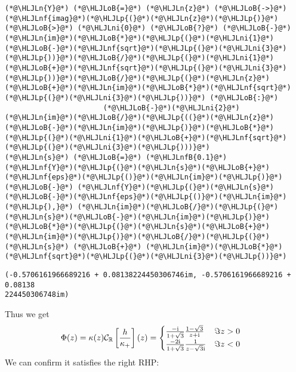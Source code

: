 \documentclass[12pt,landscape]{article}
\newcommand{\HLJLn}[1]{#1}
\newcommand{\HLJLnf}[1]{\textcolor[RGB]{66,102,213}{#1}}
\newcommand{\HLJLnfB}[1]{\textcolor[RGB]{59,151,46}{#1}}
\newcommand{\HLJLni}[1]{\textcolor[RGB]{59,151,46}{#1}}
\newcommand{\HLJLoB}[1]{\textcolor[RGB]{102,102,102}{\textbf{#1}}}
\newcommand{\HLJLp}[1]{#1}
\def\I{ {\rm i} }
\def\R{ {\mathbb R} }
\def\CC{ {\cal C} }
\def\br[#1]{\left[{#1}\right]}
\begin{document}
{\begin{lstlisting}
(*@\HLJLn{Y}@*) (*@\HLJLoB{=}@*) (*@\HLJLn{z}@*) (*@\HLJLoB{->}@*) (*@\HLJLnf{imag}@*)(*@\HLJLp{(}@*)(*@\HLJLn{z}@*)(*@\HLJLp{)}@*) (*@\HLJLoB{>}@*) (*@\HLJLni{0}@*) (*@\HLJLoB{?}@*) (*@\HLJLoB{-}@*)(*@\HLJLn{im}@*)(*@\HLJLoB{*}@*)(*@\HLJLp{(}@*)(*@\HLJLni{1}@*)(*@\HLJLoB{-}@*)(*@\HLJLnf{sqrt}@*)(*@\HLJLp{(}@*)(*@\HLJLni{3}@*)(*@\HLJLp{))}@*)(*@\HLJLoB{/}@*)(*@\HLJLp{(}@*)(*@\HLJLni{1}@*)(*@\HLJLoB{+}@*)(*@\HLJLnf{sqrt}@*)(*@\HLJLp{(}@*)(*@\HLJLni{3}@*)(*@\HLJLp{))}@*)(*@\HLJLoB{/}@*)(*@\HLJLp{(}@*)(*@\HLJLn{z}@*)(*@\HLJLoB{+}@*)(*@\HLJLn{im}@*)(*@\HLJLoB{*}@*)(*@\HLJLnf{sqrt}@*)(*@\HLJLp{(}@*)(*@\HLJLni{3}@*)(*@\HLJLp{))}@*) (*@\HLJLoB{:}@*)
                       (*@\HLJLoB{-}@*)(*@\HLJLni{2}@*)(*@\HLJLn{im}@*)(*@\HLJLoB{/}@*)(*@\HLJLp{((}@*)(*@\HLJLn{z}@*)(*@\HLJLoB{-}@*)(*@\HLJLn{im}@*)(*@\HLJLp{)}@*)(*@\HLJLoB{*}@*)(*@\HLJLp{(}@*)(*@\HLJLni{1}@*)(*@\HLJLoB{+}@*)(*@\HLJLnf{sqrt}@*)(*@\HLJLp{(}@*)(*@\HLJLni{3}@*)(*@\HLJLp{)))}@*)
(*@\HLJLn{s}@*) (*@\HLJLoB{=}@*) (*@\HLJLnfB{0.1}@*)
(*@\HLJLnf{Y}@*)(*@\HLJLp{(}@*)(*@\HLJLn{s}@*)(*@\HLJLoB{+}@*)(*@\HLJLnf{eps}@*)(*@\HLJLp{()}@*)(*@\HLJLn{im}@*)(*@\HLJLp{)}@*) (*@\HLJLoB{-}@*) (*@\HLJLnf{Y}@*)(*@\HLJLp{(}@*)(*@\HLJLn{s}@*)(*@\HLJLoB{-}@*)(*@\HLJLnf{eps}@*)(*@\HLJLp{()}@*)(*@\HLJLn{im}@*)(*@\HLJLp{),}@*) (*@\HLJLn{im}@*)(*@\HLJLoB{/}@*)(*@\HLJLp{(}@*)(*@\HLJLn{s}@*)(*@\HLJLoB{-}@*)(*@\HLJLn{im}@*)(*@\HLJLp{)}@*)(*@\HLJLoB{*}@*)(*@\HLJLp{(}@*)(*@\HLJLn{s}@*)(*@\HLJLoB{+}@*)(*@\HLJLn{im}@*)(*@\HLJLp{)}@*)(*@\HLJLoB{/}@*)(*@\HLJLp{(}@*)(*@\HLJLn{s}@*) (*@\HLJLoB{+}@*) (*@\HLJLn{im}@*)(*@\HLJLoB{*}@*)(*@\HLJLnf{sqrt}@*)(*@\HLJLp{(}@*)(*@\HLJLni{3}@*)(*@\HLJLp{))}@*)
\end{lstlisting}

\begin{lstlisting}
(-0.5706161966689216 + 0.08138224450306746im, -0.5706161966689216 + 0.08138
224450306748im)
\end{lstlisting}


Thus we get
\begin{align*}
\Phi(z)  &= \kappa(z) \CC_\R\br[{h \over \kappa_+}](z) = \begin{cases}
{-\I \over 1+\sqrt 3} {1-\sqrt 3 \over z+\I} & \Im z > 0 \\
{-2 \I  \over 1+ \sqrt{3}} {1 \over z-\sqrt{3}\I} & \Im z < 0
\end{cases}
\end{align*}
We can confirm it satisfies the right RHP:


}
\end{document}
